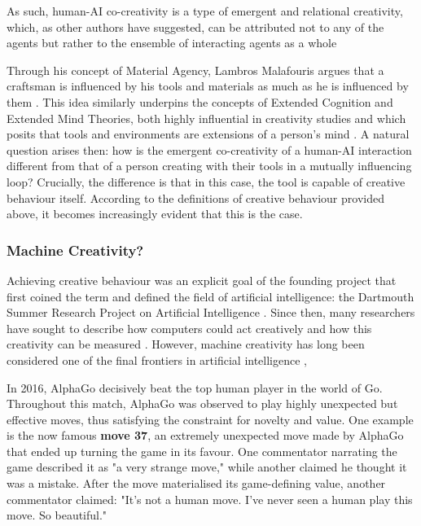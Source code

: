 As such, human-AI co-creativity is a type of emergent and relational creativity, which, as other authors have suggested, can be attributed not to any of the agents but rather to the ensemble of interacting agents as a whole \cite{Davis2013-jy, Rezwana2023-rt}

Through his concept of Material Agency, Lambros Malafouris argues that a craftsman is influenced by his tools and materials as much as he is influenced by them \cite{Malafouris2013-by}. This idea similarly underpins the concepts of Extended Cognition and Extended Mind Theories, both highly influential in creativity studies and which posits that tools and environments are extensions of a person's mind \cite{Clark1998-yi}. A natural question arises then: how is the emergent co-creativity of a human-AI interaction different from that of a person creating with their tools in a mutually influencing loop? Crucially, the difference is that in this case, the tool is capable of creative behaviour itself. According to the definitions of creative behaviour provided above, it becomes increasingly evident that this is the case. 

\subsubsection{Machine Creativity?}

Achieving creative behaviour was an explicit goal of the founding project that first coined the term and defined the field of artificial intelligence: the Dartmouth Summer Research Project on Artificial Intelligence \cite{McCarthy1955-ls}. Since then,  many researchers have sought to describe how computers could act creatively and how this creativity can be measured \cite{Boden2003-hk, Boden1998-yn, Colton2012-jc, Bown2012-gg, Moruzzi2020-mw, Wiggins2006-zd, Jordanous2012-kw}. However, machine creativity has long been considered one of the final frontiers in artificial intelligence \cite{Colton2021-bt},

In 2016, AlphaGo decisively beat the top human player in the world of Go. Throughout this match, AlphaGo was observed to play highly unexpected but effective moves, thus satisfying the constraint for novelty and value. One example is the now famous \textbf{move 37}, an extremely unexpected move made by AlphaGo that ended up turning the game in its favour. One commentator narrating the game described it as "a very strange move," while another claimed he thought it was a mistake. After the move materialised its game-defining value, another commentator claimed: "It's not a human move. I've never seen a human play this move. So beautiful."

